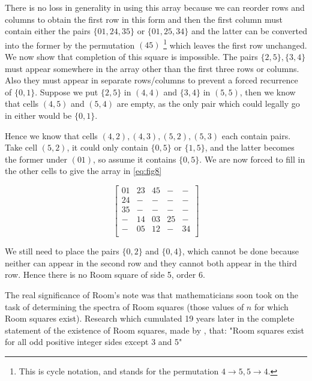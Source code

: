 \documentclass[
  11pt,
  a4paper]{book}\usepackage[]{graphicx}\usepackage[]{xcolor}
\begin{document}
There is no loss in generality in using this array because we can reorder rows and columns to obtain the first row in this form and then the first column must contain either the pairs $\{01, 24, 35\}$ or $\{01, 25, 34\}$ and the latter can be converted into the former by the permutation $(45)$ \footnote{This is cycle notation, and stands for the permutation $4 \rightarrow 5, 5 \rightarrow 4$.} which leaves the first row unchanged.
We now show that completion of this square is impossible.
The pairs $\{2,5\},\{3,4\}$ must appear somewhere in the array other than the first three rows or columns.
Also they must appear in separate rows/columns to prevent a forced recurrence of $\{0, 1\}$.
Suppose we put $\{2, 5\}$ in $(4, 4)$ and $\{3, 4\}$ in $(5, 5)$, then we know that cells $(4, 5)$ and $(5, 4)$ are empty, as the only pair which could legally go in either would be $\{0, 1\}$.

Hence we know that cells $(4, 2), (4, 3), (5, 2), (5, 3)$ each contain pairs.
Take cell $(5, 2)$, it could only contain $\{0, 5\}$ or $\{1, 5\}$, and the latter becomes the former under $(01)$, so assume it contains $\{0, 5\}$.
We are now forced to fill in the other cells to give the array in \eqref{eq:fig8}

\begin{equation}
  \label{eq:fig8}
  \begin{bmatrix}
    01 & 23 & 45 &  - & -  \\
    24 &  - &  - &  - & -  \\
    35 &  - &  - &  - & -  \\
     - & 14 & 03 & 25 & -  \\
     - & 05 & 12 &  - & 34 \\
  \end{bmatrix}
\end{equation}

We still need to place the pairs $\{0, 2\}$ and $\{0, 4\}$, which cannot be done because neither can appear in the second row and they cannot both appear in the third row.
Hence there is no Room square of side 5, order 6.

The real significance of Room’s note was that mathematicians soon took on the task of determining the spectra of Room squares (those values of $n$ for which Room squares exist).
Research which cumulated 19 years later in the complete statement of the existence of Room squares, made by \cite{wallisSolutionRoomSquare1974}, that: "Room squares exist for all odd positive integer sides except 3 and 5"
\end{document}
